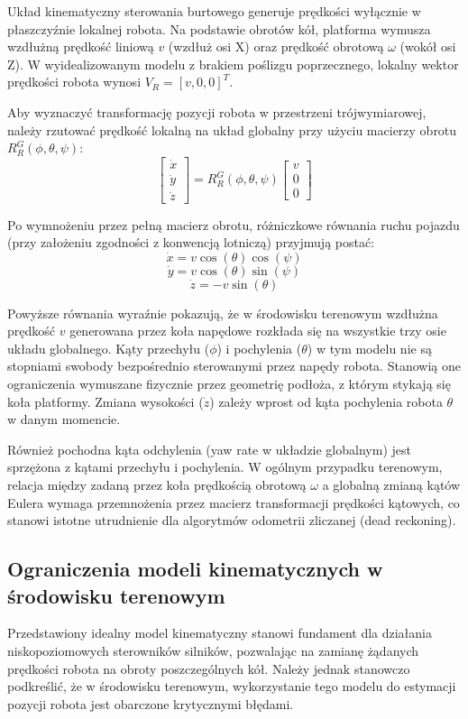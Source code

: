 \documentclass[a4paper,twoside,12pt]{book}
\begin{document}
Układ kinematyczny sterowania burtowego generuje prędkości wyłącznie w płaszczyźnie lokalnej robota. Na podstawie obrotów kół, platforma wymusza wzdłużną prędkość liniową $v$ (wzdłuż osi X) oraz prędkość obrotową $\omega$ (wokół osi Z). W wyidealizowanym modelu z brakiem poślizgu poprzecznego, lokalny wektor prędkości robota wynosi $V_R = [v, 0, 0]^T$.

Aby wyznaczyć transformację pozycji robota w przestrzeni trójwymiarowej, należy rzutować prędkość lokalną na układ globalny przy użyciu macierzy obrotu $R_R^G(\phi, \theta, \psi)$:
\[
\begin{bmatrix} \dot{x} \\ \dot{y} \\ \dot{z} \end{bmatrix} = R_R^G(\phi, \theta, \psi) \begin{bmatrix} v \\ 0 \\ 0 \end{bmatrix}
\]

Po wymnożeniu przez pełną macierz obrotu, różniczkowe równania ruchu pojazdu (przy założeniu zgodności z konwencją lotniczą) przyjmują postać:
\[\dot{x} = v \cos(\theta) \cos(\psi)\]
\[\dot{y} = v \cos(\theta) \sin(\psi)\]
\[\dot{z} = -v \sin(\theta)\]

Powyższe równania wyraźnie pokazują, że w środowisku terenowym wzdłużna prędkość $v$ generowana przez koła napędowe rozkłada się na wszystkie trzy osie układu globalnego. Kąty przechyłu ($\phi$) i pochylenia ($\theta$) w tym modelu nie są stopniami swobody bezpośrednio sterowanymi przez napędy robota. Stanowią one ograniczenia wymuszane fizycznie przez geometrię podłoża, z którym stykają się koła platformy. Zmiana wysokości ($\dot{z}$) zależy wprost od kąta pochylenia robota $\theta$ w danym momencie.

Również pochodna kąta odchylenia (yaw rate w układzie globalnym) jest sprzężona z kątami przechyłu i pochylenia. W ogólnym przypadku terenowym, relacja między zadaną przez koła prędkością obrotową $\omega$ a globalną zmianą kątów Eulera wymaga przemnożenia przez macierz transformacji prędkości kątowych, co stanowi istotne utrudnienie dla algorytmów odometrii zliczanej (dead reckoning).

\subsection{Ograniczenia modeli kinematycznych w środowisku terenowym}
Przedstawiony idealny model kinematyczny stanowi fundament dla działania niskopoziomowych sterowników silników, pozwalając na zamianę żądanych prędkości robota na obroty poszczególnych kół. Należy jednak stanowczo podkreślić, że w środowisku terenowym, wykorzystanie tego modelu do estymacji pozycji robota jest obarczone krytycznymi błędami. 
\end{document}
